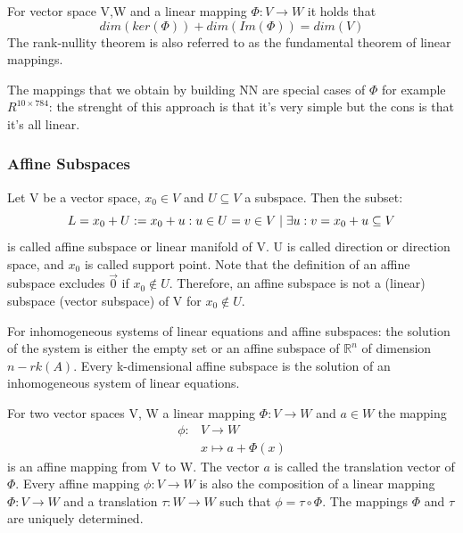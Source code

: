 \begin{theorem}
    For vector space V,W and a linear mapping $ \Phi: V \rightarrow W  $ it holds that \[ 
        dim(ker(\Phi)) + dim(Im(\Phi)) = dim(V)
    \]
    The rank-nullity theorem is also referred to as the fundamental theorem of linear mappings.
\end{theorem}
The mappings that we obtain by building NN are special cases of $ \Phi $ for example $ R^{10\times784} $: the strenght of this approach is that it's very simple but the cons is that it's all linear.
\subsubsection{Affine Subspaces}
\begin{definition}
    Let V be a vector space, $x_0 \in V$ and $U \subseteq V$ a subspace. Then the subset: \[ 
        L = x_0 + U : = {x_0+u: u\in U} \\
        ={v\in V \mid \exists u : v = x_0 +u} \subseteq V
    \]is called affine subspace or linear manifold of V. U is called direction or direction space, and $x_0$ is called support point. Note that the definition of an affine subspace excludes $\vec{0}$ if $x_0 \notin U$. Therefore, an affine subspace is not a (linear) subspace (vector subspace) of V for $x_0 \notin U$.
\end{definition}
\begin{remark}
    For inhomogeneous systems of linear equations and affine subspaces:
    the solution of the system is either the empty set or an affine subspace of $\mathbb{R}^n$ of dimension $n-rk(A)$. Every k-dimensional affine subspace is the solution of an inhomogeneous system of linear equations. 
\end{remark}
\begin{definition}
    For two vector spaces V, W a linear mapping $\Phi: V \longrightarrow W$ and $a \in W$ the mapping
    \begin{align*}
        \phi: &V \longrightarrow W \\
        &x \mapsto a + \Phi(x)
    \end{align*}
    is an affine mapping from V to W. The vector $a$ is called the translation vector of $\Phi$.
    Every affine mapping $\phi: V \longrightarrow W$ is also the composition of a linear mapping $\Phi: V \longrightarrow W$ and a translation $\tau: W \longrightarrow W$ such that $\phi = \tau \circ \Phi$. The mappings $\Phi$ and $\tau$ are uniquely determined.
\end{definition}
